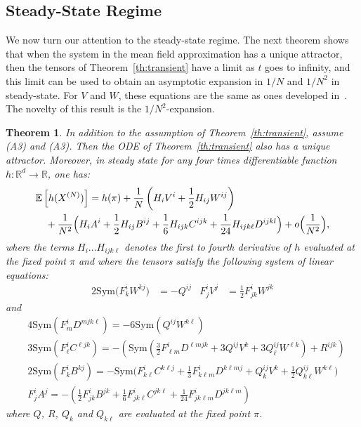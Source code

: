\documentclass[sigconf]{acmart}
\newtheorem{theorem}{Theorem}
\newcommand\XN{X^{(N)}}
\newcommand\R{\mathbb{R}}
\newcommand\esp[1]{{\mathchoice{\besp{#1}}{\sesp{#1}}{\sesp{#1}}{\sesp{#1}}}}
\newcommand\besp[1]{\mathbb{E}\left[#1\right]}
\newcommand\sesp[1]{\mathbb{E}[#1]}
\newcommand\p[1]{\left(#1\right)}
\newcommand\Sym{\mathrm{Sym}}
\begin{document}
\subsection{Steady-State Regime}
\label{ssec:ss}

We now turn our attention to the steady-state regime. The next theorem
shows that when the system in the mean field approximation has a
unique attractor, then the tensors of Theorem~\ref{th:transient} have
a limit as $t$ goes to infinity, and this limit can be used to
obtain an asymptotic expansion in $1/N$ and $1/N^2$ in
steady-state. For $V$ and $W$, these equations are the same as ones
developed in~\cite{gast2017refined}. The novelty of this result is the
$1/N^2$-expansion.

\begin{theorem}
  \label{th:steady}
  In addition to the assumption of Theorem~\ref{th:transient}, assume
  (A3) and (A3). Then the ODE of Theorem~\ref{th:transient} also has
  a unique attractor. Moreover, in steady state for any four times
  differentiable function $h:\R^d\to\R$, one has:
  \begin{align*}
    &\esp{h(\XN)}=h(\pi) + \frac1N\p{ H_iV^i + \frac12 H_{ij}W^{ij}}\\
    &\quad+\frac1{N^2}\Big(H_iA^i+\frac12H_{ij}B^{ij}+\frac16H_{ijk}C^{ijk}+\frac1{24}H_{ijk\ell}D^{ijkl}\Big)+o\Big(\frac1{N^2}\Big), 
  \end{align*}
  where the terms $H_i\dots H_{ijk\ell}$ denotes the first to fourth
  derivative of $h$ evaluated at the fixed point $\pi$ and where the
  tensors satisfy the following system of linear equations:
  \begin{align*}
    2\Sym\Big(F^{i}_kW^{kj}\Big) & = -Q^{ij} &  F^i_jV^j & = \frac12F^i_{jk} W^{jk}
  \end{align*}
  and 
  \begin{align*}
    &4\Sym(F^{i}_mD^{mjk\ell})
    = - 6\Sym(Q^{ij}W^{k\ell})\\
    &3\Sym(F^{i}_{\ell}C^{\ell jk})
    = -\p{\Sym\p{\frac32F^i_{\ell m}D^{\ell
      mjk}+3Q^{ij}V^{k}+3Q^{ij}_\ell W^{\ell k}} + R^{ijk}}\\  
    &2\Sym(F^{i}_kB^{kj})=-\Sym\Big(F^{i}_{k\ell} C^{k\ell j} {+}
    \frac13 F^{i}_{k\ell m} D^{k\ell mj}{+} Q^{ij}_kV^k {+}\frac12Q^{ij}_{k\ell}W^{k\ell}\Big)\\
    &F^i_{j}A^j = -\p{\frac12F^{i}_{jk}B^{jk} + \frac16F^i_{jk\ell}C^{jk\ell}
    + \frac1{24}F^i_{jk\ell m}D^{jk\ell m}}
  \end{align*}
  where $Q$, $R$, $Q_k$ and $Q_{k\ell}$ are evaluated at the fixed
  point $\pi$.
\end{theorem}
\end{document}
